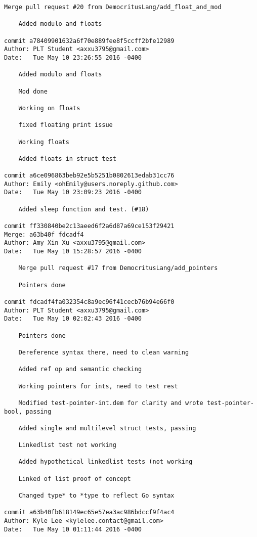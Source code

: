\begin{lstlisting}[backgroundcolor=\color{white}]
    Merge pull request #20 from DemocritusLang/add_float_and_mod
    
    Added modulo and floats

commit a78409901632a6f70e889fee8f5ccff2bfe12989
Author: PLT Student <axxu3795@gmail.com>
Date:   Tue May 10 23:26:55 2016 -0400

    Added modulo and floats
    
    Mod done
    
    Working on floats
    
    fixed floating print issue
    
    Working floats
    
    Added floats in struct test

commit a6ce096863beb92e5b5251b0802613edab31cc76
Author: Emily <ohEmily@users.noreply.github.com>
Date:   Tue May 10 23:09:23 2016 -0400

    Added sleep function and test. (#18)

commit ff330840be2c13aeed6f2a6d87a69ce153f29421
Merge: a63b40f fdcadf4
Author: Amy Xin Xu <axxu3795@gmail.com>
Date:   Tue May 10 15:28:57 2016 -0400

    Merge pull request #17 from DemocritusLang/add_pointers
    
    Pointers done

commit fdcadf4fa032354c8a9ec96f41cecb76b94e66f0
Author: PLT Student <axxu3795@gmail.com>
Date:   Tue May 10 02:02:43 2016 -0400

    Pointers done
    
    Dereference syntax there, need to clean warning
    
    Added ref op and semantic checking
    
    Working pointers for ints, need to test rest
    
    Modified test-pointer-int.dem for clarity and wrote test-pointer-bool, passing
    
    Added single and multilevel struct tests, passing
    
    Linkedlist test not working
    
    Added hypothetical linkedlist tests (not working
    
    Linked of list proof of concept
    
    Changed type* to *type to reflect Go syntax

commit a63b40fb618149ec65e57ea3ac986bdccf9f4ac4
Author: Kyle Lee <kylelee.contact@gmail.com>
Date:   Tue May 10 01:11:44 2016 -0400


\end{lstlisting}
